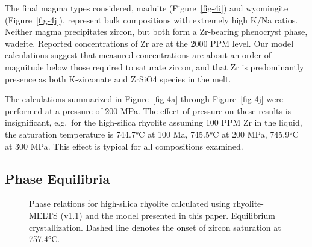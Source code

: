 \documentclass[
]{agujournal2019}
\begin{document}
The final magma types considered, maduite (Figure~\ref{fig-4i}) and
wyomingite (Figure~\ref{fig-4j}), represent bulk compositions with
extremely high K/Na ratios. Neither magma precipitates zircon, but both
form a Zr-bearing phenocryst phase, wadeite. Reported concentrations of
Zr are at the 2000 PPM level. Our model calculations suggest that
measured concentrations are about an order of magnitude below those
required to saturate zircon, and that Zr is predominantly presence as
both K-zirconate and ZrSiO4 species in the melt.

The calculations summarized in Figure~\ref{fig-4a} through
Figure~\ref{fig-4j} were performed at a pressure of 200 MPa. The effect
of pressure on these results is insignificant, e.g.~for the high-silica
rhyolite assuming 100 PPM Zr in the liquid, the saturation temperature
is 744.7°C at 100 Ma, 745.5°C at 200 MPa, 745.9°C at 300 MPa. This
effect is typical for all compositions examined.

\subsection{Phase Equilibria}\label{phase-equilibria}

\begin{figure}


\caption{\label{fig-5}Phase relations for high-silica rhyolite
calculated using rhyolite-MELTS (v1.1) and the model presented in this
paper. Equilibrium crystallization. Dashed line denotes the onset of
zircon saturation at 757.4°C.}

\end{figure}%
\end{document}
